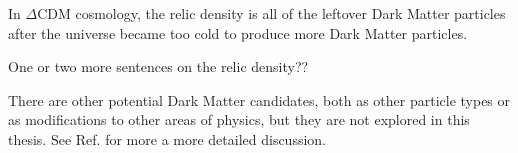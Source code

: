   In $\Delta$CDM cosmology, the relic density is all of the leftover Dark Matter particles after the universe became too cold to produce more Dark Matter particles.

  {\color{red}One or two more sentences on the relic density??}

  There are other potential Dark Matter candidates, both as other particle types or as modifications to other areas of physics, but they are not explored in this thesis.
  See Ref. \cite{DMPrimer} for more a more detailed discussion.



